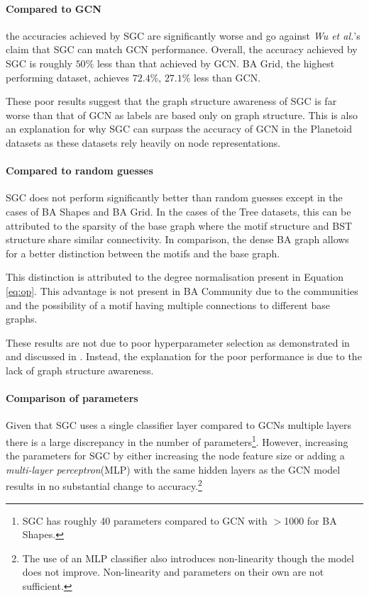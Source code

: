 \paragraph{Compared to GCN}
the accuracies achieved by SGC are significantly worse and go against \textit{Wu et al.}'s claim that SGC can match GCN performance.
Overall, the accuracy achieved by SGC is roughly $50\%$ less than that achieved by GCN.
BA Grid, the highest performing dataset, achieves $72.4\%$, $27.1\%$ less than GCN.

These poor results suggest that the graph structure awareness of SGC is far worse than that of GCN as labels are based only on graph structure.
This is also an explanation for why SGC can surpass the accuracy of GCN in the Planetoid~\cite{kipf2016semi} datasets as these datasets rely heavily on node representations.

\paragraph{Compared to random guesses}
SGC does not perform significantly better than random guesses except in the cases of BA Shapes and BA Grid.
In the cases of the Tree datasets, this can be attributed to the sparsity of the base graph where the motif structure and BST structure share similar connectivity.
In comparison, the dense BA graph allows for a better distinction between the motifs and the base graph.

This distinction is attributed to the degree normalisation present in Equation \ref{eq:op}.
This advantage is not present in BA Community due to the communities and the possibility of a motif having multiple connections to different base graphs.

These results are not due to poor hyperparameter selection as demonstrated in  and discussed in .
Instead, the explanation for the poor performance is due to the lack of graph structure awareness.

\paragraph{Comparison of parameters}
Given that SGC uses a single classifier layer compared to GCNs multiple layers there is a large discrepancy in the number of parameters\footnote{SGC has roughly 40 parameters compared to GCN with $>$1000 for BA Shapes.}.
However, increasing the parameters for SGC by either increasing the node feature size or adding a \emph{multi-layer perceptron}(MLP) with the same hidden layers as the GCN model results in no substantial change to accuracy.\footnote{The use of an MLP classifier also introduces non-linearity though the model does not improve. Non-linearity and parameters on their own are not sufficient.}

